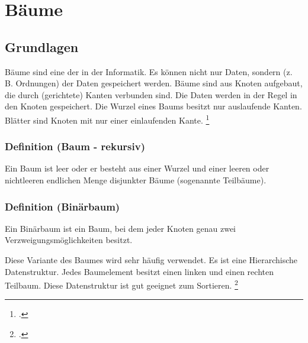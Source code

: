 \documentclass{lehramt-informatik-haupt}
\begin{document}

\chapter{Bäume}

\section{Grundlagen}

\begin{liQuellen}
\item \cite[Kapitel 6.2.2.3, Seite 186]{schneider}
\item \cite[Seite 345-419]{saake}
\end{liQuellen}

Bäume sind eine der  in
der Informatik. Es können nicht nur Daten, sondern (z. B. Ordnungen) der Daten gespeichert werden. Bäume sind
aus Knoten aufgebaut, die durch (gerichtete) Kanten verbunden sind. Die
Daten werden in der Regel in den Knoten gespeichert. Die Wurzel eines
Baums besitzt nur auslaufende Kanten. Blätter sind Knoten mit nur einer
einlaufenden Kante.
\footcite[Seite 2]{aud:fs:5}

%

\subsection{Definition (Baum - rekursiv)}

Ein Baum ist leer oder er besteht aus einer Wurzel und einer leeren oder
nichtleeren endlichen Menge disjunkter Bäume (sogenannte Teilbäume).

%

\subsection{Definition (Binärbaum)}

Ein Binärbaum ist ein Baum, bei dem jeder Knoten genau zwei
Verzweigungsmöglichkeiten besitzt.

Diese Variante des Baumes wird sehr häufig verwendet. Es ist eine
Hierarchische Datenstruktur. Jedes Baumelement besitzt einen linken und
einen rechten Teilbaum. Diese Datenstruktur ist gut geeignet zum
Sortieren.
\footcite[Seite 3]{aud:fs:5}

\literatur
\end{document}
